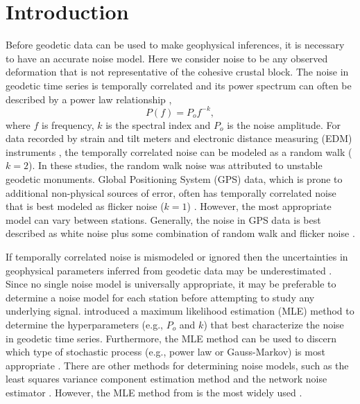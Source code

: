 \documentclass{svjour3}                     %
\begin{document}
\section{Introduction}\label{sec:Introduction}
Before geodetic data can be used to make geophysical inferences, it is necessary to have an accurate noise model. Here we consider noise to be any observed deformation that is not representative of the cohesive crustal block. The noise in geodetic time series is temporally correlated and its power spectrum can often be described by a power law relationship \citep{Agnew1992},       
\begin{equation}\label{eq.PowerLaw}
  P(f) = P_o f^{-k},
\end{equation}
where $f$ is frequency, $k$ is the spectral index and $P_o$ is the noise amplitude. For data recorded by strain and tilt meters \citep{Wyatt1982,Wyatt1989} and electronic distance measuring (EDM) instruments \citep{Langbein1997}, the temporally correlated noise can be modeled as a random walk ($k = 2$). In these studies, the random walk noise was attributed to unstable geodetic monuments. Global Positioning System (GPS) data, which is prone to additional non-physical sources of error, often has temporally correlated noise that is best modeled as flicker noise ($k = 1$) \citep{Zhang1997,Mao1999,Williams2004}. However, the most appropriate model can vary between stations. Generally, the noise in GPS data is best described as white noise plus some combination of random walk and flicker noise \citep{Langbein2008}. 

If temporally correlated noise is mismodeled or ignored then the uncertainties in geophysical parameters inferred from geodetic data may be underestimated \citep{Zhang1997}. Since no single noise model is universally appropriate, it may be preferable to determine a noise model for each station before attempting to study any underlying signal. \citet{Langbein1997} introduced a maximum likelihood estimation (MLE) method to determine the hyperparameters (e.g., $P_o$ and $k$) that best characterize the noise in geodetic time series. Furthermore, the MLE method can be used to discern which type of stochastic process (e.g., power law or Gauss-Markov) is most appropriate \citep{Langbein2004}. There are other methods for determining noise models, such as the least squares variance component estimation method \citep{Amiri-Simkooei2007} and the network noise estimator \citep{Dmitrieva2015}. However, the MLE method from \citet{Langbein1997} is the most widely used \citep[e.g.,][]{Langbein2004,Langbein2008,Zhang1997,Mao1999,Williams2004,Hill2009,King2009,Murray2017}.  
\end{document}
